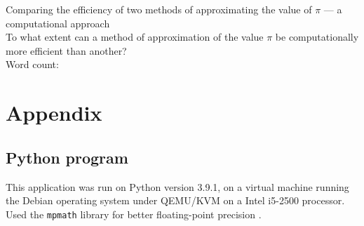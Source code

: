 \documentclass[12pt,a4paper]{article}
\begin{document}
\doublespacing %


\begin{titlepage}
    \begin{center}
    \vspace*{4cm}
        Comparing the efficiency of two methods of approximating the value of $\pi$ ---
        a computational approach\\
    \vspace{1cm}
    To what extent can a method of approximation of the value $\pi$ be computationally more efficient than another? \\
    \vspace{4cm}
    Word count: 
    \vfill
    \vspace{0.1cm}
    \end{center}
    \end{titlepage}



\begin{center}
\tableofcontents
\vspace{1in}

\end{center}




\newpage













\printbibliography[heading=bibintoc, title=Works Cited]

\appendix
\section{Appendix}
\label{app}
\subsection{Python program}
\label{app:scripts}
This application was run on Python version 3.9.1, on a virtual machine 
running the Debian operating system under QEMU/KVM on a Intel i5-2500 
processor. Used the \verb|mpmath| library for better floating-point 
precision \cite{mpmath}. 

\end{document}
